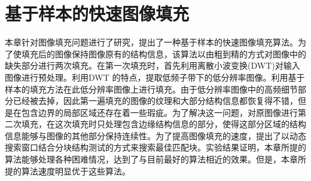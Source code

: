 ﻿\chapter{基于样本的快速图像填充}
 \label{cha:Inpainting}
 本章针对图像填充问题进行了研究，提出了一种基于样本的快速图像填充算法。为了使填充后的图像保持图像原有的结构信息，该算法以由粗到精的方式对图像中的缺失部分进行两次填充。在第一次填充时，首先利用离散小波变换(DWT)对输入图像进行预处理。利用DWT 的特点，提取低频子带下的低分辨率图像。利用基于样本的填充方法在此低分辨率图像上进行填充。由于低分辨率图像中的高频细节部分已经被去掉，因此第一遍填充的图像的纹理和大部分结构信息都恢复得不错，但是在包含边界的局部区域还存在着一些瑕疵。为了解决这一问题，对原图像进行第二次填充，在这次填充时只处理包含边缘结构信息的部分，使得这部分区域的结构信息能够与图像的其他部分保持连续性。为了提高图像填充的速度，提出了以动态搜索窗口结合分块结构测试的方式来搜索最佳匹配块。实验结果证明，本章所提的算法能够处理各种困难情况，达到了与目前最好的算法相近的效果。但是，本章所提的算法速度明显优于这些算法。
